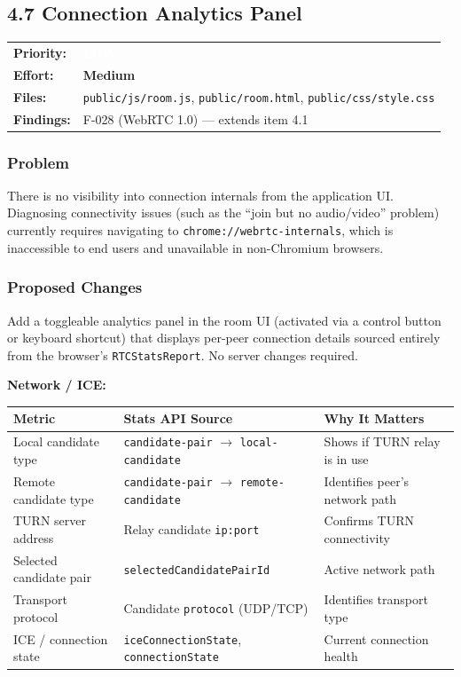 \documentclass[11pt,letterpaper]{article}
\newcommand{\prilow}{\colorbox{notapplicable}{\textcolor{white}{\small\textbf{LOW}}}}
\newcommand{\effmedium}{\colorbox{partial!30}{\small\textbf{Medium}}}
\begin{document}
\subsection{4.7 Connection Analytics Panel}

\begin{tabular}{ll}
\textbf{Priority:} & \prilow \\
\textbf{Effort:} & \effmedium \\
\textbf{Files:} & \texttt{public/js/room.js}, \texttt{public/room.html}, \texttt{public/css/style.css} \\
\textbf{Findings:} & F-028 (WebRTC 1.0) --- extends item 4.1 \\
\end{tabular}

\subsubsection{Problem}

There is no visibility into connection internals from the application UI. Diagnosing connectivity issues (such as the ``join but no audio/video'' problem) currently requires navigating to \texttt{chrome://webrtc-internals}, which is inaccessible to end users and unavailable in non-Chromium browsers.

\subsubsection{Proposed Changes}

Add a toggleable analytics panel in the room UI (activated via a control button or keyboard shortcut) that displays per-peer connection details sourced entirely from the browser's \texttt{RTCStatsReport}. No server changes required.

\textbf{Network / ICE:}
\begin{center}
\begin{tabularx}{\textwidth}{L{5cm}L{4cm}L{4.5cm}}
\toprule
\textbf{Metric} & \textbf{Stats API Source} & \textbf{Why It Matters} \\
\midrule
Local candidate type & \texttt{candidate-pair} $\to$ \texttt{local-candidate} & Shows if TURN relay is in use \\
Remote candidate type & \texttt{candidate-pair} $\to$ \texttt{remote-candidate} & Identifies peer's network path \\
TURN server address & Relay candidate \texttt{ip:port} & Confirms TURN connectivity \\
Selected candidate pair & \texttt{selectedCandidatePairId} & Active network path \\
Transport protocol & Candidate \texttt{protocol} (UDP/TCP) & Identifies transport type \\
ICE / connection state & \texttt{iceConnectionState}, \texttt{connectionState} & Current connection health \\
\bottomrule
\end{tabularx}
\end{center}
\end{document}
